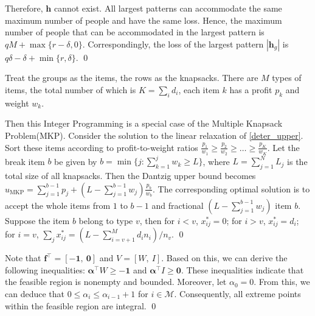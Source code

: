 \begin{pf}
Therefore, $\bm{h}$ cannot exist. All largest patterns can accommodate the same maximum number of people and have the same loss. Hence, the maximum number of people that can be accommodated in the largest pattern is $q M + \max\{r-\delta, 0\}$. Correspondingly, the loss of the largest pattern $|\bm{h}_{g}|$ is $q \delta -\delta + \min\{r, \delta\}$.
\qed
\end{pf}

\begin{pf}
  Treat the groups as the items, the rows as the knapsacks. There are $M$ types of items, the total number of which is $K = \sum_{i} d_i$, each item $k$ has a profit $p_k$ and weight $w_k$. 
  
  Then this Integer Programming is a special case of the Multiple Knapsack Problem(MKP). Consider the solution to the linear relaxation of \eqref{deter_upper}. Sort these items according to profit-to-weight ratios $\frac{p_1}{w_1} \geq \frac{p_2}{w_2} \geq \ldots \geq \frac{p_K}{w_K}$. 
  Let the break item $b$ be given by $b=\min \{j: \sum_{k=1}^j w_k \geq L\}$, where $L = \sum_{j=1}^{N} L_j$ is the total size of all knapsacks. Then the Dantzig upper bound \cite{dantzig1957discrete} becomes $u_{\mathrm{MKP}}=\sum_{j=1}^{b-1} p_j+\left(L-\sum_{j=1}^{b-1} w_j\right) \frac{p_b}{w_b}$. The corresponding optimal solution is to accept the whole items from $1$ to $b-1$ and fractional $(L-\sum_{j=1}^{b-1} w_j)$ item $b$. Suppose the item $b$ belong to type $v$, then for $i < v$, $x_{ij}^{*} = 0$; for $i > v$, $x_{ij}^{*} = d_{i}$; for $i = v$, $\sum_{j} x_{ij}^{*} = (L - \sum_{i = v+1}^{M} {d_i n_i})/ n_v$. \qed
\end{pf}


\begin{pf}

Note that $\mathbf{f}^{\intercal} = [-\mathbf{1},~\mathbf{0}]$ and $V = [W,~I]$. Based on this, we can derive the following inequalities: $\bm{\alpha}^{\intercal}W \geq -\mathbf{1}$ and $\bm{\alpha}^{\intercal} I \geq \mathbf{0}$. These inequalities indicate that the feasible region is nonempty and bounded. Moreover, let $\alpha_0 = 0$. From this, we can deduce that $0 \leq \alpha_i \leq \alpha_{i-1} +1$ for $i \in \mathcal{M}$. Consequently, all extreme points within the feasible region are integral.
  \qed
\end{pf}

